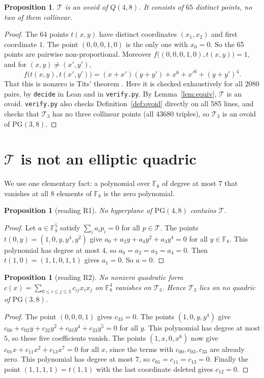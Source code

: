 \documentclass[11pt]{article}
\newtheorem{proposition}[theorem]{Proposition}
\theoremstyle{definition}
\theoremstyle{remark}
\newcommand{\F}{\mathbb{F}_8}
\newcommand{\pol}{f}
\begin{document}
\begin{proposition}\label{prop:ovoid}
$\mathcal{T}$ is an ovoid of $Q(4,8)$. It consists of $65$ distinct points, no
two of them collinear.
\end{proposition}
\begin{proof}
The $64$ points $t(x,y)$ have distinct coordinates $(x_1,x_2)$ and first
coordinate $1$. The point $(0,0,0,1,0)$ is the only one with $x_0=0$. So the
65 points are pairwise non-proportional. Moreover
$\pol\big((0,0,0,1,0),t(x,y)\big)=1$, and for $(x,y)\ne(x',y')$,
\[
\pol\big(t(x,y),t(x',y')\big)=(x+x')(y+y')+x^6+x'^6+(y+y')^4 .
\]
That this is nonzero is Tits' theorem \cite{Tits}. Here it is checked
exhaustively for all $2080$ pairs, by \texttt{decide} in Lean and in
\texttt{verify.py}. By Lemma~\ref{lem:equiv}, $\mathcal{T}$ is an ovoid.
\texttt{verify.py} also checks Definition~\ref{def:ovoid} directly on all
585 lines, and checks that $\mathcal{T}_3$ has no three collinear points (all
$43680$ triples), so $\mathcal{T}_3$ is an ovoid of $\mathrm{PG}(3,8)$.
\end{proof}

\section{\texorpdfstring{$\mathcal{T}$ is not an elliptic quadric}{T is not an elliptic quadric}}
We use one elementary fact: a polynomial over $\F$ of degree at most $7$ that
vanishes at all $8$ elements of $\F$ is the zero polynomial.

\begin{proposition}[reading R1]\label{prop:hyp}
No hyperplane of $\mathrm{PG}(4,8)$ contains $\mathcal{T}$.
\end{proposition}
\begin{proof}
Let $a\in\F^5$ satisfy $\sum_i a_ip_i=0$ for all $p\in\mathcal{T}$. The points
$t(0,y)=(1,0,y,y^4,y^2)$ give $a_0+a_2y+a_4y^2+a_3y^4=0$ for all $y\in\F$. This
polynomial has degree at most $4$, so $a_0=a_2=a_3=a_4=0$. Then
$t(1,0)=(1,1,0,1,1)$ gives $a_1=0$. So $a=0$.
\end{proof}

\begin{proposition}[reading R2]\label{prop:quad}
No nonzero quadratic form $c(x)=\sum_{0\le i\le j\le 3}c_{ij}x_ix_j$ on $\F^4$
vanishes on $\mathcal{T}_3$. Hence $\mathcal{T}_3$ lies on no quadric of
$\mathrm{PG}(3,8)$.
\end{proposition}
\begin{proof}
The point $(0,0,0,1)$ gives $c_{33}=0$. The points $(1,0,y,y^4)$ give
$c_{00}+c_{02}y+c_{22}y^2+c_{03}y^4+c_{23}y^5=0$ for all $y$. This polynomial has
degree at most $5$, so these five coefficients vanish. The points
$(1,x,0,x^6)$ now give $c_{01}x+c_{11}x^2+c_{13}x^7=0$ for all $x$, since
the terms with $c_{00},c_{03},c_{33}$ are already zero. This polynomial has
degree at most $7$, so $c_{01}=c_{11}=c_{13}=0$. Finally the point
$(1,1,1,1)=t(1,1)$ with the last coordinate deleted gives $c_{12}=0$.
\end{proof}
\end{document}
